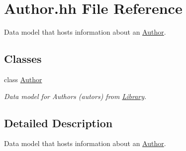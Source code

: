 \hypertarget{_author_8hh}{}\section{Author.\+hh File Reference}
\label{_author_8hh}


Data model that hosts information about an \hyperlink{class_author}{Author}.  


\subsection*{Classes}
\begin{DoxyCompactItemize}
\item 
class \hyperlink{class_author}{Author}
\begin{DoxyCompactList}\small\item\em Data model for Authors (autors) from \hyperlink{class_library}{Library}. \end{DoxyCompactList}\end{DoxyCompactItemize}


\subsection{Detailed Description}
Data model that hosts information about an \hyperlink{class_author}{Author}. 

